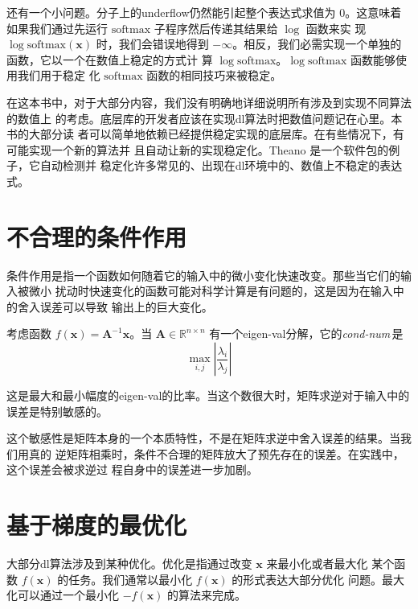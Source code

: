 还有一个小问题。分子上的\gls*{underflow}仍然能引起整个表达式求值为 $0$。这意味着
如果我们通过先运行 $\mathrm{softmax}$ 子程序然后传递其结果给 $\log$ 函数来实
现 $\log\mathrm{softmax(\pmb{x})}$ 时，我们会错误地得到
$-\infty$。相反，我们必需实现一个单独的函数，它以一个在数值上稳定的方式计
算 $\log\mathrm{softmax}$。$\log\mathrm{softmax}$ 函数能够使用我们用于稳定
化 $\mathrm{softmax}$ 函数的相同技巧来被稳定。

在这本书中，对于大部分内容，我们没有明确地详细说明所有涉及到实现不同算法的数值上
的考虑。底层库的开发者应该在实现\gls*{dl}算法时把数值问题记在心里。本书的大部分读
者可以简单地依赖已经提供稳定实现的底层库。在有些情况下，有可能实现一个新的算法并
且自动让新的实现稳定化。Theano
\citep{bergstra+al:2010-scipy-small,Bastien-2012}是一个软件包的例子，它自动检测并
稳定化许多常见的、出现在\gls*{dl}环境中的、数值上不稳定的表达式。

\section{不合理的条件作用}
\label{sec:poor_conditioning}

条件作用是指一个函数如何随着它的输入中的微小变化快速改变。那些当它们的输入被微小
扰动时快速变化的函数可能对科学计算是有问题的，这是因为在输入中的舍入误差可以导致
输出上的巨大变化。

考虑函数 $f(\pmb{x}) = \pmb{A}^{-1}\pmb{x}$。当 $\pmb{A} \in \mathbb{R}^{n
  \times n}$ 有一个\gls*{eigen-val}分解，它的\emph{\gls{cond-num}}\,是
\begin{equation}
  \max_{i,j}|\frac{\lambda_i}{\lambda_j}|
\end{equation}

这是最大和最小幅度的\gls*{eigen-val}的比率。当这个数很大时，矩阵求逆对于输入中的
误差是特别敏感的。

这个敏感性是矩阵本身的一个本质特性，不是在矩阵求逆中舍入误差的结果。当我们用真的
逆矩阵相乘时，条件不合理的矩阵放大了预先存在的误差。在实践中，这个误差会被求逆过
程自身中的误差进一步加剧。

\section{基于梯度的最优化}
\label{sec:gradient-based_optimization}

大部分\gls*{dl}算法涉及到某种优化。优化是指通过改变 $\pmb{x}$ 来最小化或者最大化
某个函数 $f(\pmb{x})$ 的任务。我们通常以最小化 $f(\pmb{x})$ 的形式表达大部分优化
问题。最大化可以通过一个最小化 $-f(\pmb{x})$ 的算法来完成。

